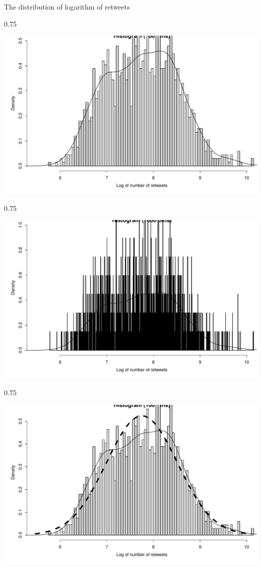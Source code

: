 \documentclass{beamer}\usepackage[]{graphicx}\usepackage[]{color}
\newenvironment{knitrout}{}{} %
\renewenvironment{knitrout}{\begin{spacing}{0.75}\begin{tiny}}{\end{tiny}\end{spacing}}
\begin{document}
\begin{frame}{The distribution of logarithm of retweets\;\;}
\begin{knitrout}
{\centering \includegraphics[width=0.89\linewidth]{figure/graphics-unnamed-chunk-10-1} 

}



\end{knitrout}

\begin{knitrout}\small
{}\color{fgcolor}

{\centering \includegraphics[width=0.89\linewidth]{figure/graphics-unnamed-chunk-11-1} 

}



\end{knitrout}

\begin{knitrout}\small
{}\color{fgcolor}

{\centering \includegraphics[width=0.89\linewidth]{figure/graphics-unnamed-chunk-12-1} 

}
\end{knitrout}
\end{frame}
\end{document}
